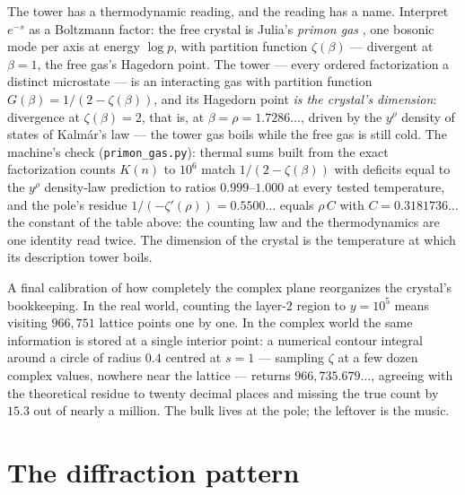 \documentclass[11pt]{article}
\theoremstyle{remark}
\begin{document}
The tower has a thermodynamic reading, and the reading has a name. Interpret $e^{-s}$ as a
Boltzmann factor: the free crystal is Julia's \emph{primon gas} \cite{Julia}, one bosonic mode per
axis at energy $\log p$, with partition function $\zeta(\beta)$ --- divergent at $\beta = 1$, the
free gas's Hagedorn point. The tower --- every ordered factorization a distinct microstate --- is
an interacting gas with partition function $G(\beta) = 1/(2 - \zeta(\beta))$, and its Hagedorn
point \emph{is the crystal's dimension}: divergence at $\zeta(\beta) = 2$, that is, at
$\beta = \rho = 1.7286\ldots$, driven by the $y^{\rho}$ density of states of Kalm\'ar's law ---
the tower gas boils while the free gas is still cold. The machine's check
(\texttt{primon\_gas.py}): thermal sums built from the exact factorization counts $K(n)$ to
$10^6$ match $1/(2-\zeta(\beta))$ with deficits equal to the $y^{\rho}$ density-law prediction to
ratios $0.999$--$1.000$ at every tested temperature, and the pole's residue
$1/(-\zeta'(\rho)) = 0.5500\ldots$ equals $\rho\, C$ with $C = 0.3181736\ldots$ the constant of
the table above: the counting law and the thermodynamics are one identity read twice. The
dimension of the crystal is the temperature at which its description tower boils.

A final calibration of how completely the complex plane reorganizes the crystal's bookkeeping. In the
real world, counting the layer-$2$ region to $y = 10^5$ means visiting $966{,}751$ lattice points one
by one. In the complex world the same information is stored at a single interior point: a numerical
contour integral around a circle of radius $0.4$ centred at $s = 1$ --- sampling $\zeta$ at a few
dozen complex values, nowhere near the lattice --- returns $966{,}735.679\ldots$, agreeing with the
theoretical residue to twenty decimal places and missing the true count by $15.3$ out of nearly a
million. The bulk lives at the pole; the leftover is the music.

\section{The diffraction pattern}
\end{document}
